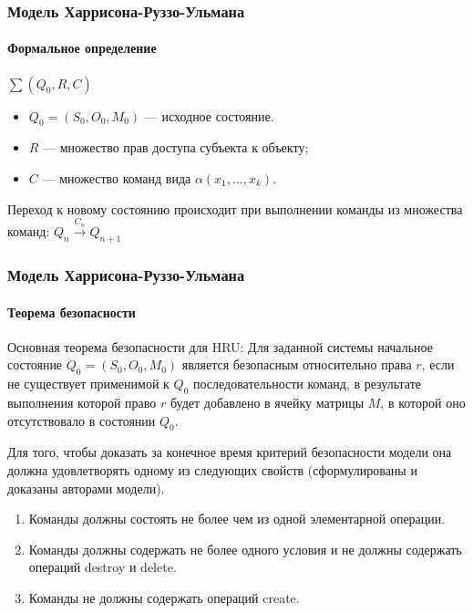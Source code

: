 \begin{frame}
    \frametitle{Модель Харрисона-Руззо-Ульмана}
    \framesubtitle{Формальное определение}
    $\sum(Q_0,R,C)$
    \begin{itemize}
        \item $Q_0=(S_0, O_0, M_0)$ --- исходное состояние.
        \item $R$ --- множество прав доступа субъекта к объекту;
        \item $C$ --- множество команд вида $\alpha(x_1,\ldots,x_k)$.
    \end{itemize}
    Переход к новому состоянию происходит при выполнении команды из множества команд: $Q_n\xrightarrow{C_n}Q_{n+1}$
\end{frame}


\begin{frame}
    \frametitle{Модель Харрисона-Руззо-Ульмана}
    \framesubtitle{Теорема безопасности}
    
    \begin{definition}%
        \alert{Основная теорема безопасности для HRU}: Для заданной системы начальное состояние $Q_0=(S_0, O_0, M_0)$
        является безопасным относительно права $r$, если не существует применимой к $Q_0$ последовательности команд,
        в результате выполнения которой право $r$ будет добавлено в ячейку матрицы $M$, в которой оно отсутствовало в
        состоянии $Q_0$.
    \end{definition}

     {
        Для того, чтобы доказать за конечное время критерий безопасности модели она должна удовлетворять одному из 
        следующих свойств (сформулированы и доказаны авторами модели).
    }
    
    \begin{enumerate}
        \item Команды должны состоять не более чем из одной элементарной операции.
        \item Команды должны содержать не более одного условия и не должны содержать операций destroy и delete.
        \item Команды не должны содержать операций create.
    \end{enumerate}
\end{frame}


